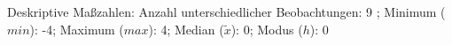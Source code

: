 				\label{tableValues:cski02e}
				\vspace*{-\baselineskip}
                    \begin{noten}
                	    \note{} Deskriptive Maßzahlen:
                	    Anzahl unterschiedlicher Beobachtungen: 9%
                	    ; 
                	      Minimum ($min$): -4; 
                	      Maximum ($max$): 4; 
                	      Median ($\tilde{x}$): 0; 
                	      Modus ($h$): 0
                     \end{noten}

